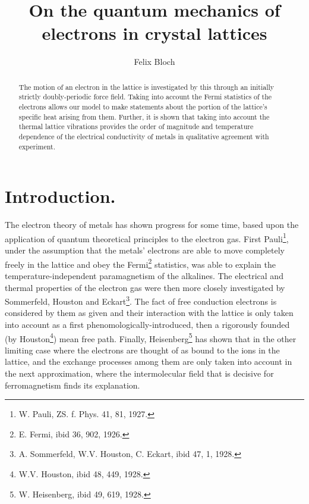 \begin{paper}{1}
\begin{header}
\title{On the quantum mechanics of electrons in crystal lattices}
\author{Felix Bloch}
\makeheader
\end{header}

\newcommand{\mfa}{\mathfrak{a}}
\newcommand{\mfb}{\mathfrak{b}}
\newcommand{\mfc}{\mathfrak{c}}
\newcommand{\mfr}{\mathfrak{r}}

\begin{abstract}
The motion of an electron in the lattice is investigated by  this through an initially strictly doubly-periodic force field. Taking into account the Fermi statistics of the electrons allows our model to make statements about the portion of the lattice's specific heat arising from them. Further, it is shown that taking into account the thermal lattice vibrations provides the order of magnitude and temperature dependence of the electrical conductivity of metals in qualitative agreement with experiment.
\end{abstract}

\section*{Introduction.} The electron theory of metals has shown progress for some time, based upon the application of quantum theoretical principles to the electron gas. First Pauli\footnote{W. Pauli, ZS. f. Phys. 41, 81, 1927.}, under the assumption that the metals' electrons are able to move completely freely in the lattice and obey the Fermi\footnote{E. Fermi, ibid 36, 902, 1926.} statistics, was able to explain the temperature-independent paramagnetism of the alkalines. The electrical and thermal properties of the electron gas were then more closely investigated by Sommerfeld, Houston and Eckart\footnote{A. Sommerfeld, W.V. Houston, C. Eckart, ibid 47, 1, 1928.}. The fact of free conduction electrons is considered by them as given and their interaction with the lattice is only taken into account as a first phenomologically-introduced, then a rigorously founded (by Houston\footnote{W.V. Houston, ibid 48, 449, 1928.}) mean free path. Finally, Heisenberg\footnote{W. Heisenberg, ibid 49, 619, 1928.} has shown that in the other limiting case where the electrons are thought of as bound to the ions in the lattice, and the exchange processes among them are only taken into account in the next approximation, where the intermolecular field that is decisive for ferromagnetism finds its explanation. 


\end{paper}
